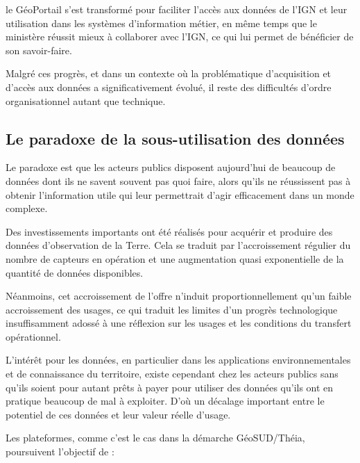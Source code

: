 \item le GéoPortail s'est transformé pour faciliter l'accès aux données de l'IGN et
leur utilisation dans les systèmes d'information métier, en même temps que le
ministère réussit mieux à collaborer avec l'IGN, ce qui lui permet de
bénéficier de son savoir-faire.

\stopitemize

Malgré ces progrès, et dans un contexte où la problématique d'acquisition et
d'accès aux données a significativement évolué, il reste des difficultés
d'ordre organisationnel autant que technique.


\subsection[constats:paradoxe_donnees]
{Le paradoxe de la sous-utilisation des données}

Le paradoxe est que les acteurs publics disposent aujourd'hui de beaucoup de données dont
ils ne savent souvent pas quoi faire, alors qu'ils ne
réussissent pas à obtenir l'information utile qui leur permettrait d'agir
efficacement dans un monde complexe.


Des investissements importants ont été réalisés pour acquérir
et produire des données d'observation de la Terre.
Cela se traduit par l'accroissement régulier du
nombre de capteurs en opération et une augmentation quasi exponentielle
de la quantité de données disponibles.

Néanmoins, cet accroissement de l'offre n'induit proportionnellement qu'un
faible accroissement des usages, ce qui traduit les limites d'un progrès
technologique insuffisamment adossé à une réflexion sur les usages et les
conditions du transfert opérationnel.

L'intérêt pour les données, en particulier dans les applications
environnementales et de connaissance du territoire, existe cependant chez les
acteurs publics sans qu'ils soient pour autant prêts à payer pour utiliser des
données qu'ils ont en pratique beaucoup de mal à exploiter. D'où un décalage
important entre le potentiel de ces données et leur valeur réelle d’usage.

Les plateformes, comme c'est le cas dans la démarche GéoSUD/Théia, poursuivent
l'objectif de :

